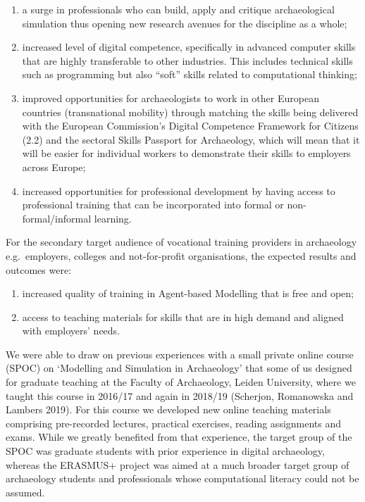 \documentclass[
]{article}
\begin{document}
\begin{enumerate}
\def\labelenumi{\arabic{enumi}.}
\item
  a surge in professionals who can build, apply and critique archaeological simulation thus opening new research avenues for the discipline as a whole;
\item
  increased level of digital competence, specifically in advanced computer skills that are highly transferable to other industries. This includes technical skills such as programming but also ``soft'' skills related to computational thinking;
\item
  improved opportunities for archaeologists to work in other European countries (transnational mobility) through matching the skills being delivered with the European Commission's Digital Competence Framework for Citizens (2.2) and the sectoral Skills Passport for Archaeology, which will mean that it will be easier for individual workers to demonstrate their skills to employers across Europe;
\item
  increased opportunities for professional development by having access to professional training that can be incorporated into formal or non-formal/informal learning.
\end{enumerate}

For the secondary target audience of vocational training providers in archaeology e.g.~employers, colleges and not-for-profit organisations, the expected results and outcomes were:

\begin{enumerate}
\def\labelenumi{\arabic{enumi}.}
\item
  increased quality of training in Agent-based Modelling that is free and open;
\item
  access to teaching materials for skills that are in high demand and aligned with employers' needs.
\end{enumerate}

We were able to draw on previous experiences with a small private online course (SPOC) on `Modelling and Simulation in Archaeology' that some of us designed for graduate teaching at the Faculty of Archaeology, Leiden University, where we taught this course in 2016/17 and again in 2018/19 (Scherjon, Romanowska and Lambers 2019). For this course we developed new online teaching materials comprising pre-recorded lectures, practical exercises, reading assignments and exams. While we greatly benefited from that experience, the target group of the SPOC was graduate students with prior experience in digital archaeology, whereas the ERASMUS+ project was aimed at a much broader target group of archaeology students and professionals whose computational literacy could not be assumed.
\end{document}
